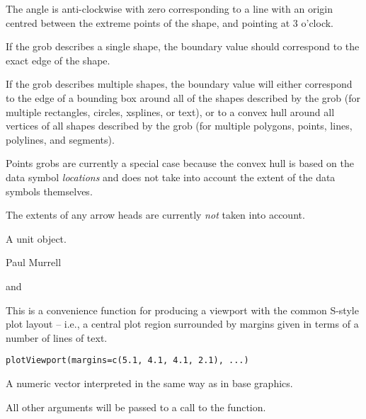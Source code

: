 \begin{Details}\relax
The angle is anti-clockwise with zero corresponding to a line
with an origin centred between the extreme
points of the shape, and pointing at 3 o'clock.

If the grob describes a single shape, the boundary value should
correspond to the exact edge of the shape.

If the grob describes multiple shapes, the boundary
value will either correspond to the edge of a bounding box around all of
the shapes described by the grob (for multiple rectangles, circles,
xsplines, or text), or to a 
convex hull around all vertices of all shapes described by the grob
(for multiple polygons, points, lines, polylines, 
and segments).

Points grobs are currently a special case because the convex hull
is based on the data symbol \emph{locations} and does not take
into account the extent of the data symbols themselves.

The extents of any arrow heads are currently \emph{not} taken into account.
\end{Details}
%
\begin{Value}
A unit object. 
\end{Value}
%
\begin{Author}\relax
Paul Murrell
\end{Author}
%
\begin{SeeAlso}\relax
{} and
\end{SeeAlso}
%
\begin{Description}\relax
This is a convenience function for producing a viewport with
the common S-style plot layout -- i.e., a central
plot region surrounded by margins given in terms of a
number of lines of text.
\end{Description}
%
\begin{Usage}
\begin{verbatim}
plotViewport(margins=c(5.1, 4.1, 4.1, 2.1), ...)
\end{verbatim}
\end{Usage}
%
\begin{Arguments}
\begin{ldescription}
\item[\code{margins}]  A numeric vector interpreted in the same way
as  in base graphics. 
\item[\code{...}]  All other arguments will be passed to a call to
the  function. 
\end{ldescription}
\end{Arguments}
